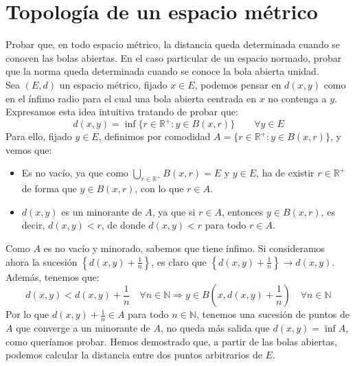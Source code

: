 \section{Topología de un espacio métrico}


\begin{ejercicio}
    Probar que, en todo espacio métrico, la distancia queda determinada cuando se conocen las bolas abiertas. En el caso particular de un espacio normado, probar que la norma queda determinada cuando se conoce la bola abierta unidad.\\

    Sea $(E,d)$ un espacio métrico, fijado $x\in E$, podemos pensar en $d(x,y)$ como en el ínfimo radio para el cual una bola abierta centrada en $x$ no contenga a $y$. Expresamos esta idea intuitiva tratando de probar que:
    \begin{equation*}
        d(x,y) = \inf\{r\in \mathbb{R}^+ : y\in B(x,r)\} \qquad \forall y\in E
    \end{equation*}
    Para ello, fijado $y\in E$, definimos por comodidad $A = \{r\in \mathbb{R}^+ : y\in B(x,r)\}$, y vemos que:
    \begin{itemize}
        \item Es no vacío, ya que como $\bigcup\limits_{r\in \mathbb{R}^+}B(x,r) = E$ y $y\in E$, ha de existir $r\in \mathbb{R}^+$ de forma que $y\in B(x,r)$, con lo que $r\in A$.
        \item $d(x,y)$ es un minorante de $A$, ya que si $r\in A$, entonces $y\in B(x,r)$, es decir, $d(x,y) < r$, de donde $d(x,y) < r$ para todo $r\in A$.
    \end{itemize}
    Como $A$ es no vacío y minorado, sabemos que tiene ínfimo. Si consideramos ahora la sucesión $\left\{d(x,y) + \frac{1}{n}\right\}$, es claro que $\left\{d(x,y)+\frac{1}{n}\right\}\longrightarrow d(x,y)$. Además, tenemos que:
    \begin{equation*}
        d(x,y) < d(x,y) + \dfrac{1}{n} \quad \forall n\in \mathbb{N} \Longrightarrow y\in B\left(x, d(x,y)+\frac{1}{n}\right) \quad \forall n\in \mathbb{N}
    \end{equation*}
    Por lo que $d(x,y)+\frac{1}{n}\in A$ para todo $n\in \mathbb{N}$, tenemos una sucesión de puntos de $A$ que converge a un minorante de $A$, no queda más salida que $d(x,y) = \inf A$, como queríamos probar.
    Hemos demostrado que, a partir de las bolas abiertas, podemos calcular la distancia entre dos puntos arbitrarios de $E$.\\



\end{ejercicio}
